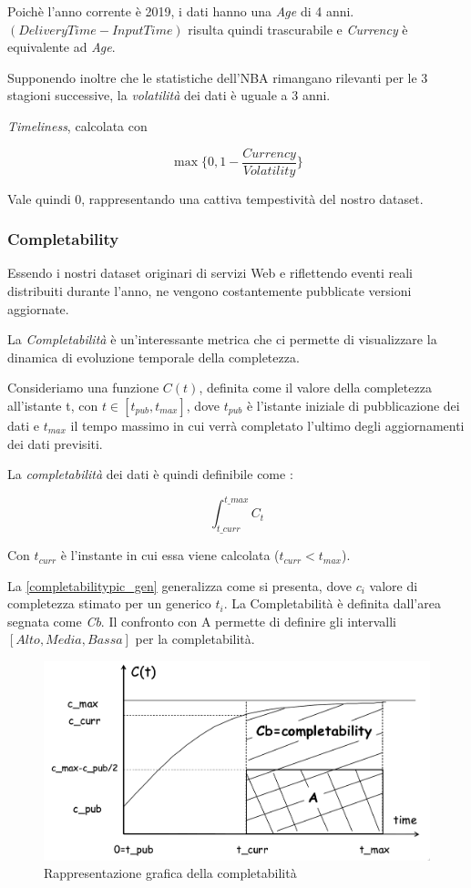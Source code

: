 Poichè l’anno corrente è 2019, i dati hanno una \textit{Age} di 4 anni. $(DeliveryTime - InputTime)$ risulta quindi trascurabile e \textit{Currency} è equivalente  ad \textit{Age}.

Supponendo inoltre che le statistiche dell’NBA rimangano rilevanti per le 3 stagioni successive, la \textit{volatilità} dei dati è uguale a 3 anni.

\textit{Timeliness}, calcolata con 

$$\max\{{0, 1 - \frac{Currency}{Volatility}}\}$$

Vale quindi 0, rappresentando una cattiva tempestività del nostro dataset.

\pagebreak
\subsubsection{Completability}
Essendo i nostri dataset originari di servizi Web e riflettendo eventi reali distribuiti durante l'anno, ne vengono costantemente pubblicate versioni aggiornate.

La \textit{Completabilità} è un'interessante metrica che ci permette di visualizzare la dinamica di evoluzione temporale della completezza.

Consideriamo una funzione $C(t)$, definita come il valore della completezza all'istante t, con $t \in [t_{pub}, t_{max}]$, dove $t_{pub}$ è l'istante iniziale di pubblicazione dei dati e $t_{max}$ il tempo massimo in cui verrà completato l'ultimo degli aggiornamenti dei dati previsiti.

La \textit{completabilità} dei dati è quindi definibile come \cite{batini2006}:

$$\int_{t\_curr}^{t\_max} C_t$$

Con $t_{curr}$ è l'instante in cui essa viene calcolata ($t_{curr} < t_{max}$).

La \autoref{completabilitypic_gen} generalizza come si presenta, dove $c_{i}$ valore di completezza stimato per un generico $t_{i}$. La Completabilità è definita dall'area segnata come \textit{Cb}. Il confronto con A permette di definire gli intervalli $[Alto, Media, Bassa]$ per la completabilità.


\begin{figure}
\caption{Rappresentazione grafica della completabilità}
\label{completabilitypic_gen}
\includegraphics[width=\linewidth]{completability_gen.png}
\end{figure}

